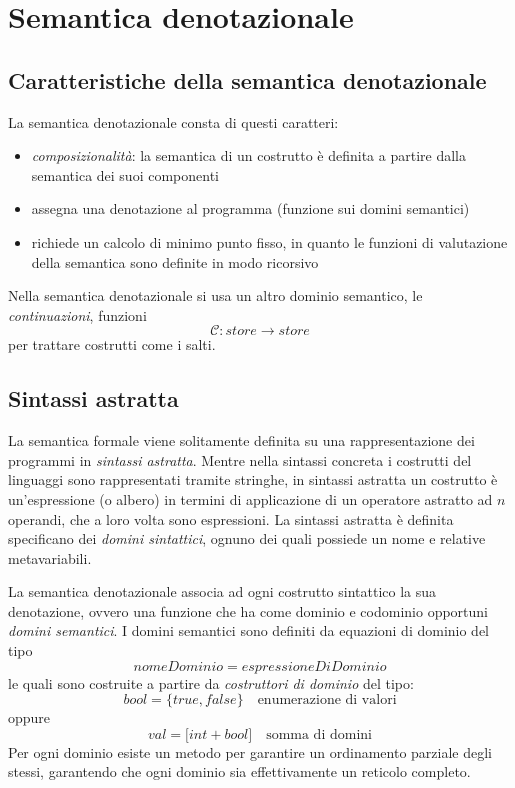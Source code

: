 \documentclass[a4paper, 10pt]{article}
\begin{document}
	\newpage
	
	\section{Semantica denotazionale}
	\subsection{Caratteristiche della semantica denotazionale}
	\label{denot}
	La semantica denotazionale consta di questi caratteri:
	\begin{itemize}
		\item \textit{composizionalità}: la semantica di un costrutto è definita a partire dalla semantica dei suoi componenti
		\item assegna una denotazione al programma (funzione sui domini semantici)
		\item richiede un calcolo di minimo punto fisso, in quanto le funzioni di valutazione della semantica sono definite in modo ricorsivo
	\end{itemize}
	
	Nella semantica denotazionale si usa un altro dominio semantico, le \textit{continuazioni}, funzioni 
	\[
	\mathcal{C}:store \to store
	\]
	per trattare costrutti come i salti.
	\subsection{Sintassi astratta}
	La semantica formale viene solitamente definita su una rappresentazione dei programmi in \textit{sintassi astratta}.
	Mentre nella sintassi concreta i costrutti del linguaggi sono rappresentati tramite stringhe, in sintassi astratta un costrutto è un'espressione (o albero) in termini di applicazione di un operatore astratto ad $n$ operandi, che a loro volta sono espressioni.
	La sintassi astratta è definita specificano dei \textit{domini sintattici}, ognuno dei quali possiede un nome e relative metavariabili.
	
	La semantica denotazionale associa ad ogni costrutto sintattico la sua denotazione, ovvero una funzione che ha come dominio e codominio opportuni \textit{domini semantici}.
	I domini semantici sono definiti da equazioni di dominio del tipo 
	\[
	nomeDominio = espressioneDiDominio
	\] 
	le quali sono costruite a partire da \textit{costruttori di dominio} del tipo:
	\[
	bool = \lbrace true, false \rbrace \quad \text{enumerazione di valori}
	\]
	oppure 
	\[
	val = \lbrack int + bool \rbrack \quad \text{somma di domini}
	\]
	Per ogni dominio esiste un metodo per garantire un ordinamento parziale degli stessi, garantendo che ogni dominio sia effettivamente un reticolo completo.
	
\end{document}
